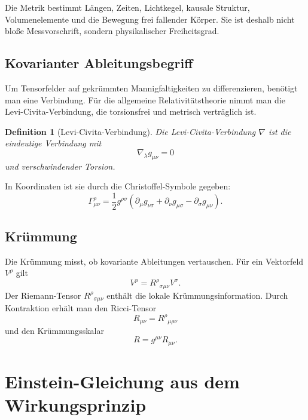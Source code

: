 \documentclass[11pt,a4paper]{book}
\newtheorem{definition}{Definition}[chapter]
\theoremstyle{remark}
\begin{document}
Die Metrik bestimmt Längen, Zeiten, Lichtkegel, kausale Struktur, Volumenelemente und die Bewegung frei fallender Körper. Sie ist deshalb nicht bloße Messvorschrift, sondern physikalischer Freiheitsgrad.

\section{Kovarianter Ableitungsbegriff}
Um Tensorfelder auf gekrümmten Mannigfaltigkeiten zu differenzieren, benötigt man eine Verbindung. Für die allgemeine Relativitätstheorie nimmt man die Levi-Civita-Verbindung, die torsionsfrei und metrisch verträglich ist.

\begin{definition}[Levi-Civita-Verbindung]
Die Levi-Civita-Verbindung $\nabla$ ist die eindeutige Verbindung mit
\begin{equation}
\nabla_\lambda g_{\mu\nu}=0
\end{equation}
und verschwindender Torsion.
\end{definition}

In Koordinaten ist sie durch die Christoffel-Symbole gegeben:
\begin{equation}
\Gamma^\rho_{\mu\nu}=\frac{1}{2}g^{\rho\sigma}(\partial_\mu g_{\nu\sigma}+\partial_\nu g_{\mu\sigma}-\partial_\sigma g_{\mu\nu}).
\end{equation}

\section{Krümmung}
Die Krümmung misst, ob kovariante Ableitungen vertauschen. Für ein Vektorfeld $V^\rho$ gilt
\begin{equation}
[\nabla_\mu,\nabla_\nu]V^\rho=R^\rho{}_{\sigma\mu\nu}V^\sigma.
\end{equation}
Der Riemann-Tensor $R^\rho{}_{\sigma\mu\nu}$ enthält die lokale Krümmungsinformation. Durch Kontraktion erhält man den Ricci-Tensor
\begin{equation}
R_{\mu\nu}=R^\rho{}_{\mu\rho\nu}
\end{equation}
und den Krümmungsskalar
\begin{equation}
R=g^{\mu\nu}R_{\mu\nu}.
\end{equation}

\chapter{Einstein-Gleichung aus dem Wirkungsprinzip}
\end{document}
